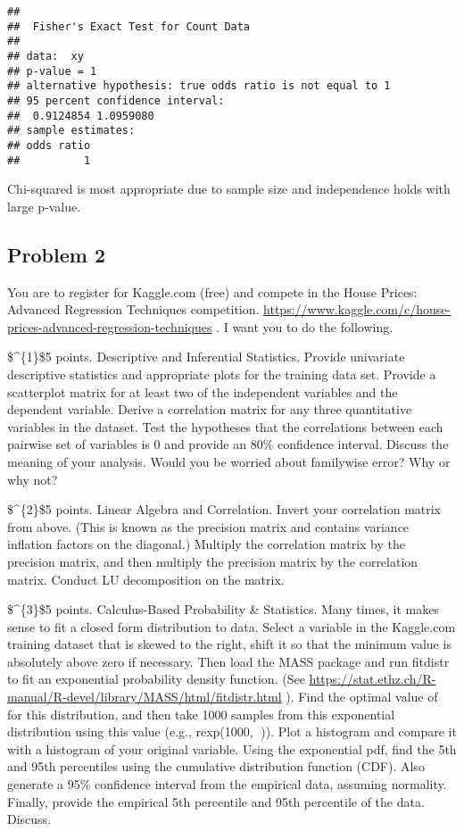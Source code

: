 \documentclass[
]{article}
\begin{document}
\begin{verbatim}
## 
##  Fisher's Exact Test for Count Data
## 
## data:  xy
## p-value = 1
## alternative hypothesis: true odds ratio is not equal to 1
## 95 percent confidence interval:
##  0.9124854 1.0959080
## sample estimates:
## odds ratio 
##          1
\end{verbatim}

Chi-squared is most appropriate due to sample size and independence
holds with large p-value.

\hypertarget{problem-2}{%
\subsection{Problem 2}\label{problem-2}}

You are to register for Kaggle.com (free) and compete in the House
Prices: Advanced Regression Techniques competition.
\url{https://www.kaggle.com/c/house-prices-advanced-regression-techniques}
. I want you to do the following.

\$\^{}\{1\}\$5 points. Descriptive and Inferential Statistics. Provide
univariate descriptive statistics and appropriate plots for the training
data set. Provide a scatterplot matrix for at least two of the
independent variables and the dependent variable. Derive a correlation
matrix for any three quantitative variables in the dataset. Test the
hypotheses that the correlations between each pairwise set of variables
is 0 and provide an 80\% confidence interval. Discuss the meaning of
your analysis. Would you be worried about familywise error? Why or why
not?

\$\^{}\{2\}\$5 points. Linear Algebra and Correlation. Invert your
correlation matrix from above. (This is known as the precision matrix
and contains variance inflation factors on the diagonal.) Multiply the
correlation matrix by the precision matrix, and then multiply the
precision matrix by the correlation matrix. Conduct LU decomposition on
the matrix.

\$\^{}\{3\}\$5 points. Calculus-Based Probability \& Statistics. Many
times, it makes sense to fit a closed form distribution to data. Select
a variable in the Kaggle.com training dataset that is skewed to the
right, shift it so that the minimum value is absolutely above zero if
necessary. Then load the MASS package and run fitdistr to fit an
exponential probability density function. (See
\url{https://stat.ethz.ch/R-manual/R-devel/library/MASS/html/fitdistr.html}
). Find the optimal value of  for this distribution, and then take 1000
samples from this exponential distribution using this value (e.g.,
rexp(1000, )). Plot a histogram and compare it with a histogram of your
original variable. Using the exponential pdf, find the 5th and 95th
percentiles using the cumulative distribution function (CDF). Also
generate a 95\% confidence interval from the empirical data, assuming
normality. Finally, provide the empirical 5th percentile and 95th
percentile of the data. Discuss.
\end{document}
